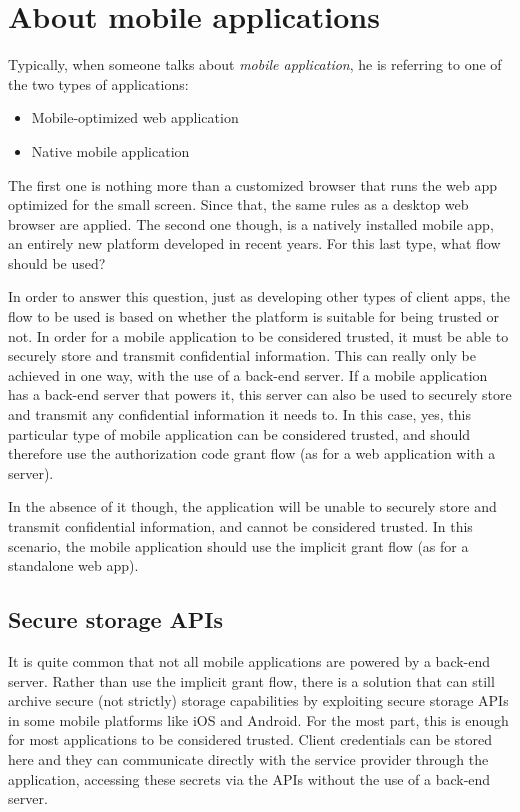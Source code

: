 \section{About mobile applications}
Typically, when someone talks about \textit{mobile application}, he is referring to one of the two types of applications:

\begin{itemize}
    \item Mobile-optimized web application
    \item Native mobile application
\end{itemize}

The first one is nothing more than a customized browser that runs the web app optimized for the small screen. Since that, the same rules as a desktop web browser are applied.
The second one though, is a natively installed mobile app, an entirely new platform developed in recent years. For this last type, what flow should be used? 

In order to answer this question, just as developing other types of client apps, the flow to be used is based on whether the platform is suitable for being trusted or not. In order for a mobile application to be considered trusted, it must be able to securely store and transmit confidential information. This can really only be achieved in
one way, with the use of a back-end server. If a mobile application has a back-end server that powers it, this server can also be used to securely store and transmit any confidential information it needs to. In this case, yes, this particular type of mobile application can be considered trusted, and should therefore use the authorization code grant flow (as for a web application with a server). 

In the absence of it though, the application will be unable to securely store and transmit confidential information, and cannot be considered trusted. In this scenario, the mobile application should use the implicit grant flow (as for a standalone web app).

\subsection{Secure storage APIs}
It is quite common that not all mobile applications are powered by a back-end server. Rather than use the implicit grant flow, there is a solution that can still archive secure (not strictly) storage capabilities by exploiting secure storage APIs in some mobile platforms like iOS and Android.  For the most part, this is enough for most applications to be considered trusted. Client credentials can be stored here and they can communicate directly with the service provider through the application, accessing these secrets via the APIs without the use of a back-end server.


